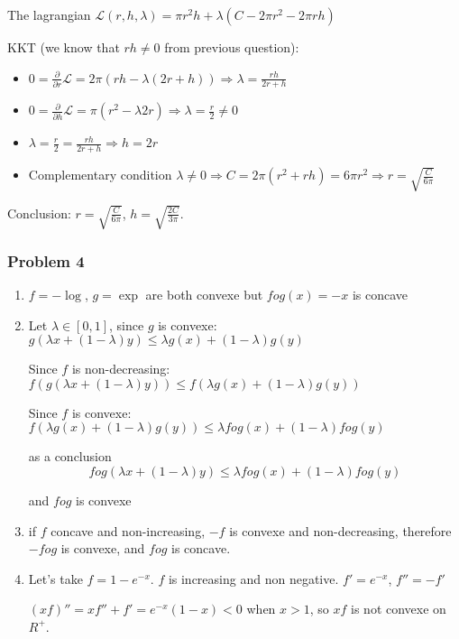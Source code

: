 \documentclass[12pt]{article}
\newcommand{\Q}[1]{\subsubsection*{Problem #1}}
\begin{document}
\begin{enumerate}
The lagrangian $\mathcal L(r, h, \lambda) = \pi r^2 h + \lambda (C - 2\pi r^2 - 2\pi r h)$

KKT (we know that $rh \ne 0$ from previous question):

\begin{itemize}
\item $0 = \frac{\partial}{ \partial r}\mathcal L = 2\pi (rh - \lambda (2r + h)) \Rightarrow \lambda = \frac{rh}{2r + h}$
\item $0 = \frac{\partial}{ \partial h}\mathcal L = \pi (r^2 - \lambda 2 r) \Rightarrow \lambda = \frac r 2 \ne 0$
\item $\lambda = \frac r 2 = \frac{rh}{2r + h} \Rightarrow h = 2r $

\item Complementary condition $\lambda \ne 0 \Rightarrow C = 2\pi (r^2 + rh) = 6\pi r^2 \Rightarrow r = \sqrt{\frac{C}{6\pi}}$
\end{itemize}

Conclusion: $r = \sqrt{\frac{C}{6\pi}}$, $h =  \sqrt{\frac{2C}{3\pi}}$.
\end{enumerate}




\Q{4}

\begin{enumerate}
\item $f = -\log$, $g = \exp$ are both convexe but $fog(x) = -x$ is concave

\item 
Let $\lambda \in [0, 1]$, since $g$ is convexe:
$g(\lambda x + (1-\lambda)y) \le \lambda g(x) + (1-\lambda)g(y)$

Since $f$ is non-decreasing:
$f(g(\lambda x + (1-\lambda)y)) \le f(\lambda g(x) + (1-\lambda)g(y))$

Since $f$ is convexe:
$f(\lambda g(x) + (1-\lambda)g(y)) \le \lambda fog(x) + (1-\lambda)fog(y)$


as a conclusion 
$$fog(\lambda x + (1-\lambda)y) \le \lambda fog(x) + (1-\lambda)fog(y)$$

and $fog$ is convexe

\item

if $f$ concave and non-increasing, $-f$ is convexe and non-decreasing, therefore $-fog$ is convexe, and $fog$ is concave.

\item

Let's take $f = 1 - e^{-x}$. 
$f$ is increasing and non negative. $f' = e^{-x}$, $f'' = -f'$


$(xf)'' = xf'' + f' = e^{-x}(1-x) < 0$ when $x > 1$, so $xf$ is not convexe on $R^+$.
 



\end{enumerate}
\end{document}
